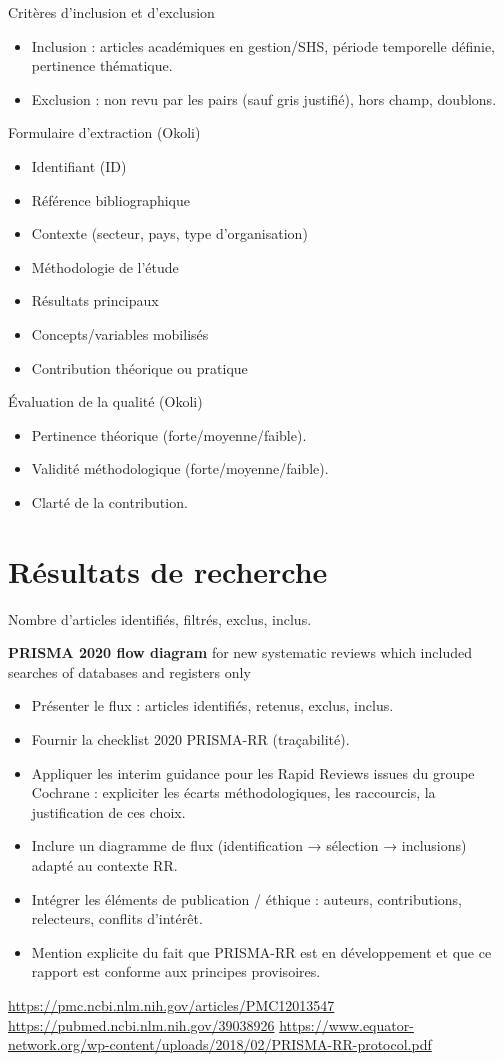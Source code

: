 \documentclass[a4paper,12pt]{article}
\begin{document}
Critères d’inclusion et d'exclusion
\begin{itemize}
\item Inclusion : articles académiques en gestion/SHS, période temporelle définie, pertinence thématique.
\item Exclusion : non revu par les pairs (sauf gris justifié), hors champ, doublons.
\end{itemize}

Formulaire d’extraction (Okoli)
\begin{itemize}
\item Identifiant (ID)
\item Référence bibliographique
\item Contexte (secteur, pays, type d’organisation)
\item Méthodologie de l’étude
\item Résultats principaux
\item Concepts/variables mobilisés
\item Contribution théorique ou pratique
\end{itemize}

Évaluation de la qualité (Okoli)
\begin{itemize}
\item Pertinence théorique (forte/moyenne/faible).
\item Validité méthodologique (forte/moyenne/faible).
\item Clarté de la contribution.
\end{itemize}
\section{Résultats de recherche}
\label{sec:orgb6f1afd}
Nombre d’articles identifiés, filtrés, exclus, inclus.

\textbf{PRISMA 2020 flow diagram} for new systematic reviews which included searches of databases and registers only
\begin{itemize}
\item Présenter le flux : articles identifiés, retenus, exclus, inclus.
\item Fournir la checklist 2020 PRISMA-RR (traçabilité).
\item Appliquer les interim guidance pour les Rapid Reviews issues du groupe Cochrane : expliciter les écarts méthodologiques, les raccourcis, la justification de ces choix.
\item Inclure un diagramme de flux (identification → sélection → inclusions) adapté au contexte RR.
\item Intégrer les éléments de publication / éthique : auteurs, contributions, relecteurs, conflits d’intérêt.
\item Mention explicite du fait que PRISMA-RR est en développement et que ce rapport est conforme aux principes provisoires.
\end{itemize}
\url{https://pmc.ncbi.nlm.nih.gov/articles/PMC12013547}
\url{https://pubmed.ncbi.nlm.nih.gov/39038926}
\url{https://www.equator-network.org/wp-content/uploads/2018/02/PRISMA-RR-protocol.pdf}
\end{document}
